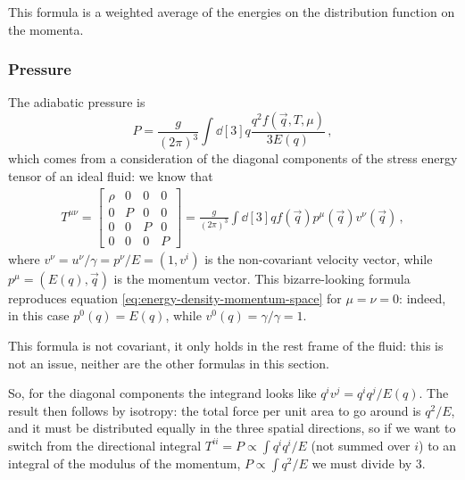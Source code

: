 \documentclass[main.tex]{subfiles}
\begin{document}
This formula is a weighted average of the energies on the distribution function on the momenta. 

\subsubsection{Pressure}

The adiabatic pressure is 
%
\begin{equation}\label{eq:pressure-momentum-space}
  P = \frac{g}{(2 \pi )^3} \int \dd[3]{q} \frac{q^2 f(\vec{q}, T, \mu )}{3E(q)} 
\,,
\end{equation}
%
which comes from a consideration of the diagonal components of the stress energy tensor of an ideal fluid: we know that 
%
\begin{align}
T^{\mu \nu }
= \left[\begin{array}{cccc}
\rho  & 0 & 0 & 0 \\ 
0 & P & 0 & 0 \\ 
0 & 0 & P & 0 \\ 
0 & 0 & 0 & P
\end{array}\right]
= \frac{g}{(2\pi )^3} \int \dd[3]{q} f(\vec{q}) p^{\mu } (\vec{q}) v^{\nu } (\vec{q})
\,,
\end{align}
%
where \(v^{\nu } = u^{\nu } / \gamma  = p^{\nu }/E = (1, v^{i})\) is the non-covariant velocity vector, while \(p^{\mu } = (E(q), \vec{q})\) is the momentum vector.
This bizarre-looking formula reproduces equation \eqref{eq:energy-density-momentum-space} for \(\mu = \nu = 0\): indeed, in this case \(p^{0} (q) = E(q)\), while \(v^{0}(q) = \gamma / \gamma = 1\).

This formula is not covariant, it only holds in the rest frame of the fluid: this is not an issue, neither are the other formulas in this section. 

So, for the diagonal components the integrand looks like \(q^{i} v^{j} = q^{i} q^{j} / E(q)\). 
The result then follows by isotropy: the total force per unit area to go around is \(q^2 / E\), and it must be distributed equally in the three spatial directions, so if we want to switch from the directional integral \(T^{ii} = P \propto \int q^{i} q^{i} / E\) (not summed over \(i\)) to an integral of the modulus of the momentum, \(P \propto \int q^2 / E\) we must divide by 3. 

\end{document}
